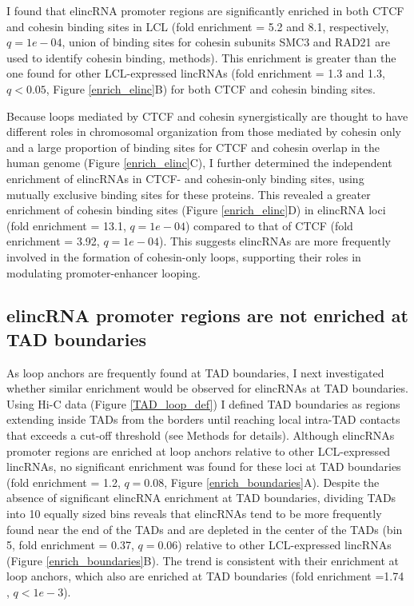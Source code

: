 \documentclass[11pt,a4paper]{report}
\begin{document}
I found that elincRNA promoter regions are significantly enriched in both CTCF and cohesin binding sites in LCL (fold enrichment = 5.2 and 8.1, respectively, $q=1e-04$, union of binding sites for cohesin subunits SMC3 and RAD21 are used to identify cohesin binding, methods). This enrichment is greater than the one found for other LCL-expressed lincRNAs (fold enrichment = 1.3 and 1.3, $q<0.05$, Figure \ref{enrich_elinc}B) for both CTCF and cohesin binding sites.

Because loops mediated by CTCF and cohesin synergistically are thought to have different roles in chromosomal organization from those mediated by cohesin only  \cite{Ji2016} and a large proportion of binding sites for CTCF and cohesin overlap in the human genome (Figure \ref{enrich_elinc}C)⁠, I further determined the independent enrichment of elincRNAs in CTCF- and cohesin-only binding sites, using mutually exclusive binding sites for these proteins. This revealed a greater enrichment of cohesin binding sites (Figure \ref{enrich_elinc}D) in elincRNA loci (fold enrichment = 13.1, $q=1e-04$) compared to that of CTCF (fold enrichment = 3.92, $q=1e-04$). This suggests elincRNAs are more frequently involved in the formation of cohesin-only loops, supporting their roles in modulating promoter-enhancer looping.

\subsection*{elincRNA promoter regions are not enriched at TAD boundaries}

As loop anchors are frequently found at TAD boundaries, I next investigated whether similar enrichment would be observed for elincRNAs at TAD boundaries. Using Hi-C data (Figure \ref{TAD_loop_def}) I defined TAD boundaries as regions extending inside TADs from the borders until reaching local intra-TAD contacts that exceeds a cut-off threshold (see Methods for details). Although elincRNAs promoter regions are enriched at loop anchors relative to other LCL-expressed lincRNAs, no significant enrichment was found for these loci  at TAD boundaries (fold enrichment = 1.2, $q=0.08$, Figure \ref{enrich_boundaries}A). Despite the absence of significant elincRNA enrichment at TAD boundaries, dividing TADs into 10 equally sized bins reveals that elincRNAs tend to be more frequently found near the end of the TADs and are depleted in the center of the TADs (bin 5, fold enrichment = 0.37, $q=0.06$) relative to other LCL-expressed lincRNAs (Figure \ref{enrich_boundaries}B). The trend is consistent with their enrichment at loop anchors, which also are enriched at TAD boundaries (fold enrichment =1.74 , $q<1e-3$).
\end{document}
